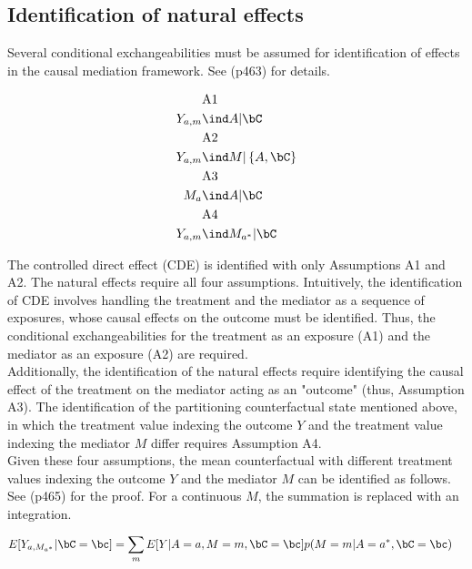 \documentclass[10pt]{article}
\begin{document}
\subsection{Identification of natural effects}
\label{sec:org5bb227a}
Several conditional exchangeabilities must be assumed for identification of effects in the causal mediation framework. See \cite{vanderweeleExplanationCausalInference2015} (p463) for details.

\begin{align*}
  &\text{A1}\\
  Y_{a,m} &\ind A | \bC\\
  &\text{A2}\\
  Y_{a,m} &\ind M | \left\{ A, \bC \right\}\\
  &\text{A3}\\
  M_{a} &\ind A | \bC\\
  &\text{A4}\\
  Y_{a,m} &\ind M_{a^{*}} |\bC\\
\end{align*}

The controlled direct effect (CDE) is identified with only Assumptions A1 and A2. The natural effects require all four assumptions.  Intuitively, the identification of CDE involves handling the treatment and the mediator as a sequence of exposures, whose causal effects on the outcome must be identified. Thus, the conditional exchangeabilities for the treatment as an exposure (A1) and the mediator as an exposure (A2) are required.\\

Additionally, the identification of the natural effects require identifying the causal effect of the treatment on the mediator acting as an "outcome" (thus, Assumption A3). The identification of the partitioning counterfactual state mentioned above, in which the treatment value indexing the outcome \(Y\) and the treatment value indexing the mediator \(M\) differ requires Assumption A4.\\

Given these four assumptions, the mean counterfactual with different treatment values indexing the outcome \(Y\) and the mediator \(M\) can be identified as follows. See \cite{vanderweeleExplanationCausalInference2015} (p465) for the proof. For a continuous \(M\), the summation is replaced with an integration.

\begin{align*}
E[Y_{a,M_{a^{*}}} | \bC = \bc] &= \sum_{m} E[Y | A = a, M = m, \bC = \bc] p(M = m | A = a^{*}, \bC = \bc)
\end{align*}
\end{document}
